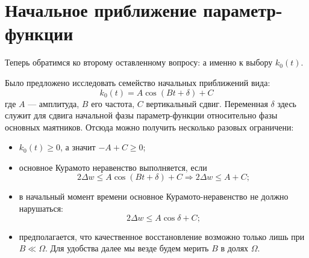 \documentclass[12pt]{article}
\begin{document}
\section{Начальное приближение параметр-функции}

Теперь обратимся ко второму оставленному вопросу: а именно к выбору $k_0(t)$.

Было предложено исследовать семейство начальных приближений вида:
\[
k_0(t)=A \cos(Bt+\delta) + C
\]
где $A$ --- амплитуда, $B$ его частота, $C$ вертикальный сдвиг. Переменная $\delta$ здесь служит для сдвига начальной фазы параметр-функции относительно фазы основных маятников. Отсюда можно получить несколько разовых ограничени:
\begin{itemize}
	\item $k_0(t) \ge 0$, а значит $-A+C \ge 0$;
	\item основное Курамото неравенство выполняется, если 
	\[
	2\Delta w \le A\cos (Bt+\delta)+C \Rightarrow 2 \Delta w \le A+C;
	\]
	\item в начальный момент времени основное Курамото-неравенство не должно нарушаться:
	\[
	2 \Delta w \le A\cos \delta + C;
	\]
	\item предполагается, что качественное восстановление возможно только лишь при $B\ll \Omega$. Для удобства далее мы везде будем мерить $B$ в долях $\Omega$.
\end{itemize}
\end{document}
